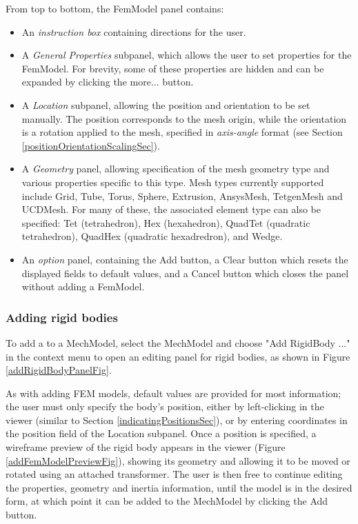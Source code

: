 \documentclass{article}
\begin{document}
From top to bottom, the FemModel panel contains:

\begin{itemize}

\item An {\it instruction box} containing directions for the user.

\item A {\it General Properties} subpanel, which allows the user to set properties
for the FemModel. For brevity, some of these properties are hidden and can
be expanded by clicking the {\sf more...} button.

\item A {\it Location} subpanel, allowing the position and orientation to be
set manually. The position corresponds to the mesh origin, while the
orientation is a rotation applied to the mesh, specified in
{\it axis-angle} format (see Section \ref{positionOrientationScalingSec}).

\item A {\it Geometry} panel, allowing specification of the mesh geometry type
and various properties specific to this type.  Mesh types currently
supported include Grid, Tube, Torus, Sphere, Extrusion, AnsysMesh,
TetgenMesh and UCDMesh.  For many of these, the associated element
type can also be specified: Tet (tetrahedron), Hex (hexahedron),
QuadTet (quadratic tetrahedron), QuadHex (quadratic hexadredron), and
Wedge.

\item An {\it option} panel, containing the {\sf Add} button, a {\sf Clear} button
which resets the displayed fields to default values, and a {\sf Cancel}
button which closes the panel without adding a FemModel.

\end{itemize}

\subsubsection{Adding rigid bodies}

To add a  to a MechModel,
select the MechModel and choose {\sf "Add RigidBody ..."} in the context menu to
open an editing panel for rigid bodies, as shown in 
Figure \ref{addRigidBodyPanelFig}.

As with adding FEM models, default values are provided for most
information; the user must only specify the body's position, either by
left-clicking in the viewer (similar to Section \ref{indicatingPositionsSec}), 
or by entering
coordinates in the {\sf position} field of the {\sf Location} subpanel.  Once
a position is specified, a wireframe preview of the rigid body appears
in the viewer (Figure \ref{addFemModelPreviewFig}), showing its geometry and
allowing it to be moved or rotated using an attached transformer. The
user is then free to continue editing the properties, geometry and
inertia information, until the model is in the desired form, at which
point it can be added to the MechModel by clicking the {\sf Add} button.
\end{document}
